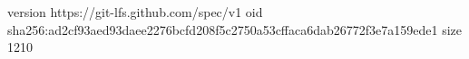 version https://git-lfs.github.com/spec/v1
oid sha256:ad2cf93aed93daee2276bcfd208f5c2750a53cffaca6dab26772f3e7a159ede1
size 1210
